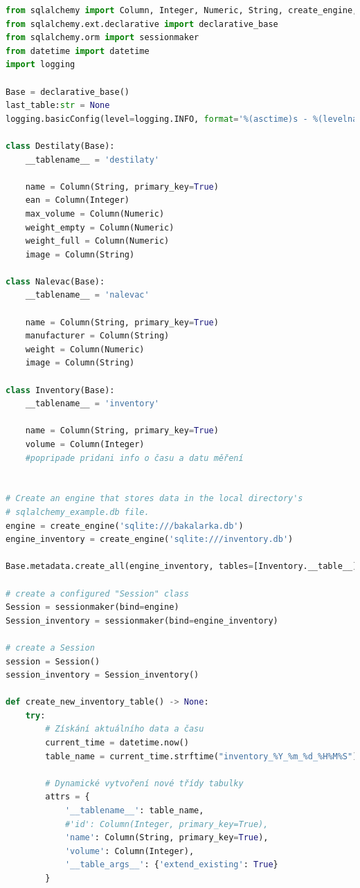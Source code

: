 \begin{lstlisting}[language=Python, caption=Ukázka třídy pro čtečku čárového kódu, frame=single]
from sqlalchemy import Column, Integer, Numeric, String, create_engine, Table, MetaData, insert
from sqlalchemy.ext.declarative import declarative_base
from sqlalchemy.orm import sessionmaker
from datetime import datetime
import logging

Base = declarative_base()
last_table:str = None
logging.basicConfig(level=logging.INFO, format='%(asctime)s - %(levelname)s - %(message)s')

class Destilaty(Base):
    __tablename__ = 'destilaty'
    
    name = Column(String, primary_key=True)
    ean = Column(Integer)
    max_volume = Column(Numeric)
    weight_empty = Column(Numeric)
    weight_full = Column(Numeric)
    image = Column(String)

class Nalevac(Base):
    __tablename__ = 'nalevac'
    
    name = Column(String, primary_key=True)
    manufacturer = Column(String)
    weight = Column(Numeric)
    image = Column(String)
     
class Inventory(Base):
    __tablename__ = 'inventory'

    name = Column(String, primary_key=True)
    volume = Column(Integer)
    #popripade pridani info o času a datu měření


# Create an engine that stores data in the local directory's
# sqlalchemy_example.db file.
engine = create_engine('sqlite:///bakalarka.db')
engine_inventory = create_engine('sqlite:///inventory.db')

Base.metadata.create_all(engine_inventory, tables=[Inventory.__table__]) #Pokud už databáze a její tabulky existují, nemusíme volat tuto metodu 

# create a configured "Session" class
Session = sessionmaker(bind=engine)
Session_inventory = sessionmaker(bind=engine_inventory)

# create a Session
session = Session()
session_inventory = Session_inventory()

def create_new_inventory_table() -> None:
    try:
        # Získání aktuálního data a času
        current_time = datetime.now()
        table_name = current_time.strftime("inventory_%Y_%m_%d_%H%M%S")

        # Dynamické vytvoření nové třídy tabulky
        attrs = {
            '__tablename__': table_name,
            #'id': Column(Integer, primary_key=True),
            'name': Column(String, primary_key=True),
            'volume': Column(Integer),
            '__table_args__': {'extend_existing': True}
        }
        

\end{lstlisting}
